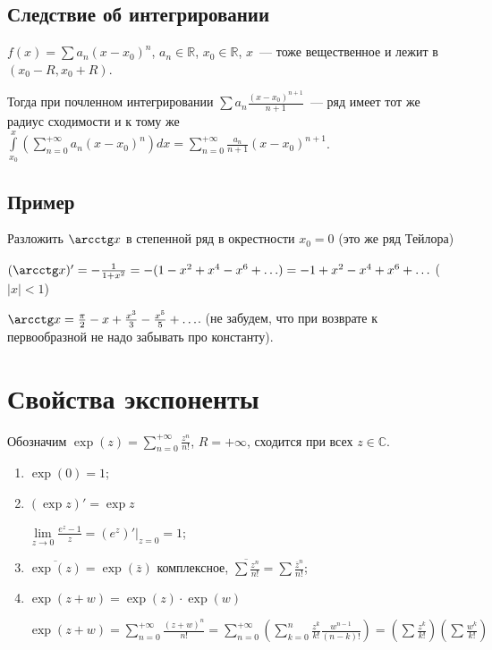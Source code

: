 \documentclass{article}
\begin{document}
        \subsection{Следствие об интегрировании}
        
            $f(x) = \sum a_n (x - x_0)^n$, $a_n \in \mathbb{R}$, $x_0 \in \mathbb{R}$, $x$~--- тоже вещественное и лежит в $(x_0 - R, x_0 + R)$.
            
            Тогда при почленном интегрировании $\sum a_n \frac{(x - x_0)^{n + 1}}{n + 1}$~--- ряд имеет тот же радиус сходимости и к тому же $\int\limits^x_{x_0} \left( \sum\limits^{+\infty}_{n = 0} a_n (x - x_0)^n \right) dx = \sum\limits^{+\infty}_{n = 0} \frac{a_n}{n + 1} (x - x_0)^{n + 1}$.
            
        \subsection{Пример}
        
            Разложить $\arcctg x$ в степенной ряд в окрестности $x_0 = 0$ (это же ряд Тейлора)
            
            $(\arcctg x)' = -\frac{1}{1 + x^2} = -(1 - x^2 + x^4 - x^6 + \ldots) = -1 + x^2 - x^4 + x^6 + \ldots$ ($|x| < 1$)
            
            $\arcctg x = \frac{\pi}{2}-x + \frac{x^3}{3} - \frac{x^5}{5} + \ldots$. (не забудем, что при возврате к первообразной не надо забывать про константу).

    \newpage
    
    \section{Свойства экспоненты}
    
        Обозначим $\exp(z) = \sum\limits^{+\infty}_{n = 0} \frac{z^n}{n!}$, $R = +\infty$, сходится при всех $z \in \mathbb{C}$.
        
        \begin{enumerate}
        
            \item $\exp(0) = 1$;
            
            \item $(\exp z)' = \exp z$
            
                $\lim\limits_{z \rightarrow 0} \frac{e^z - 1}{z} = (e^z)' \bigg|_{z = 0} = 1$;
                
            \item $\overline{\exp(z)} = \exp(\overline{z})$ комплексное, $\overline{\sum \frac{z^n}{n!}} = \sum \frac{\overline{z}^n}{n!}$;
            
            \item $\exp (z + w) = \exp(z) \cdot \exp(w)$
            
                $\exp (z + w) = \sum\limits^{+\infty}_{n = 0} \frac{(z + w)^n}{n!} = \sum\limits^{+\infty}_{n = 0} \left( \sum\limits^n_{k = 0} \frac{z^k}{k!} \frac{w^{n - 1}}{(n - k)!} \right) = \left( \sum \frac{z^k}{k!} \right) \left( \sum \frac{w^k}{k!} \right)$
                
        \end{enumerate}
        
\end{document}
